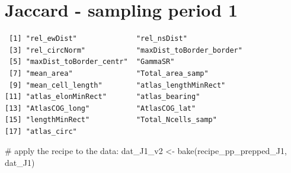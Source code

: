 \documentclass[
  letterpaper,
  DIV=11,
  numbers=noendperiod]{scrreprt}
\newenvironment{Shaded}{\begin{snugshade}}{\end{snugshade}}
\newcommand{\AttributeTok}[1]{\textcolor[rgb]{0.40,0.45,0.13}{#1}}
\newcommand{\CommentTok}[1]{\textcolor[rgb]{0.37,0.37,0.37}{#1}}
\newcommand{\DecValTok}[1]{\textcolor[rgb]{0.68,0.00,0.00}{#1}}
\newcommand{\FunctionTok}[1]{\textcolor[rgb]{0.28,0.35,0.67}{#1}}
\newcommand{\NormalTok}[1]{\textcolor[rgb]{0.00,0.23,0.31}{#1}}
\newcommand{\OtherTok}[1]{\textcolor[rgb]{0.00,0.23,0.31}{#1}}
\newcommand{\SpecialCharTok}[1]{\textcolor[rgb]{0.37,0.37,0.37}{#1}}
\begin{document}
\section{Jaccard - sampling period 1}

\begin{Shaded}
\end{Shaded}

\begin{verbatim}
 [1] "rel_ewDist"              "rel_nsDist"             
 [3] "rel_circNorm"            "maxDist_toBorder_border"
 [5] "maxDist_toBorder_centr"  "GammaSR"                
 [7] "mean_area"               "Total_area_samp"        
 [9] "mean_cell_length"        "atlas_lengthMinRect"    
[11] "atlas_elonMinRect"       "atlas_bearing"          
[13] "AtlasCOG_long"           "AtlasCOG_lat"           
[15] "lengthMinRect"           "Total_Ncells_samp"      
[17] "atlas_circ"             
\end{verbatim}

\begin{Shaded}
\begin{Highlighting}[]
\CommentTok{\# apply the recipe to the data:}
\NormalTok{dat\_J1\_v2 }\OtherTok{\textless{}{-}} \FunctionTok{bake}\NormalTok{(recipe\_pp\_prepped\_J1, dat\_J1)}
\end{Highlighting}
\end{Shaded}
\end{document}
